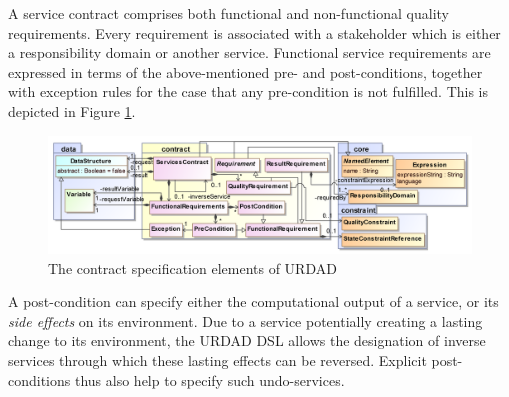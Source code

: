 {A service contract comprises both functional and non-functional quality requirements. Every requirement is associated with a stakeholder which is either a responsibility domain or another service. Functional service requirements are expressed in terms of the above-mentioned pre- and post-conditions, together with exception rules for the case that any pre-condition is not fulfilled. This is depicted in Figure \ref{fig:contractModule}.
\begin{figure}[Htbp]
  \centering
  \includegraphics{contract}
  \caption{The contract specification elements of URDAD}
  \label{fig:contractModule}
\end{figure}

A post-condition can specify either the computational output of a service, or its \emph{side effects} on its environment. Due to a service potentially creating a lasting change to its environment, the URDAD DSL allows the designation of inverse services through which these lasting effects can be reversed. Explicit post-conditions thus also help to specify such undo-services.

}
